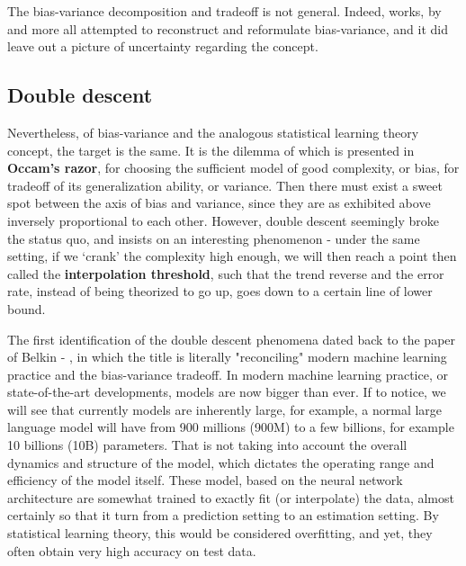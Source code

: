 \documentclass[10pt]{article}
\begin{document}
The bias-variance decomposition and tradeoff is not general. Indeed, works, by \cite{6797087,sharma_bias-variance_2014,domingos_unifeid_2000,adlam2020understandingdoubledescentrequires,yang_rethinking_2020} and more all attempted to reconstruct and reformulate bias-variance, and it did leave out a picture of uncertainty regarding the concept. 

\subsection{Double descent}

Nevertheless, of bias-variance and the analogous statistical learning theory concept, the target is the same. It is the dilemma of which is presented in \textbf{Occam's razor}, for choosing the sufficient model of good complexity, or bias, for tradeoff of its generalization ability, or variance. Then there must exist a sweet spot between the axis of bias and variance, since they are as exhibited above inversely proportional to each other. However, double descent seemingly broke the status quo, and insists on an interesting phenomenon - under the same setting, if we `crank' the complexity high enough, we will then reach a point then called the \textbf{interpolation threshold}, such that the trend reverse and the error rate, instead of being theorized to go up, goes down to a certain line of lower bound. 

The first identification of the double descent phenomena dated back to the paper of Belkin - \cite{belkin_reconciling_2019}, in which the title is literally "reconciling" modern machine learning practice and the bias-variance tradeoff. In modern machine learning practice, or state-of-the-art developments, models are now bigger than ever. If to notice, we will see that currently models are inherently large, for example, a normal large language model will have from 900 millions (900M) to a few billions, for example 10 billions (10B) parameters. That is not taking into account the overall dynamics and structure of the model, which dictates the operating range and efficiency of the model itself. These model, based on the neural network architecture are somewhat trained to exactly fit (or interpolate) the data, almost certainly so that it turn from a prediction setting to an estimation setting. By statistical learning theory, this would be considered overfitting, and yet, they often obtain very high accuracy on test data.
\end{document}
